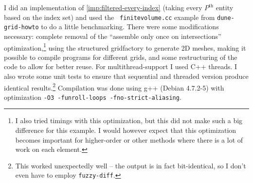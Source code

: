 \documentclass{article}
\newcommand\gridhowto{{\tt dune-grid-howto}\xspace}
\begin{document}
\begin{comment}
| Yasp       | 27.7778 | 19.1363 |       | 30.4038 | 16.9045 |       |
| ref=8      | 28.2098 | 15.3266 |       | 34.0757 | 16.4706 |       |
|            | 28.2842 | 15.4153 |       | 30.4185 | 16.7239 |       |
|            | 27.6977 | 15.5652 |       | 29.8972 | 16.8037 |       |
|------------+---------+---------+-------+---------+---------+-------|
| mean       | 27.9924 | 16.3608 |    86 | 31.1988 | 16.7257 |    93 |
| stddev     |  0.2974 |  1.8529 |       |  1.9332 |  0.1854 |       |
|------------+---------+---------+-------+---------+---------+-------|
| SGrid      | 33.3188 |         |       | 38.4664 |         |       |
| ref=8      | 32.1779 |         |       | 38.8568 |         |       |
|            | 33.7675 |         |       | 38.6083 |         |       |
|            | 34.5424 |         |       | 39.3417 |         |       |
|------------+---------+---------+-------+---------+---------+-------|
| mean       | 33.4517 |         |       | 38.8183 |         |       |
| stddev     |  0.9882 |         |       |  0.3844 |         |       |
#+TBLFM: @7$2=vmean(@-II..@-I);%

\end{comment}

I did an implementation of \ref{imp:filtered-every-index} (taking every
$P^\text{th}$ entity based on the index set) and used the {\tt
  finitevolume.cc} example from \gridhowto to do a little benchmarking.  There
were some modifications necessary: complete removal of the ``assemble only
once on intersections'' optimization,\footnote{I also tried timings with this
  optimization, but this did not make such a big difference for this example.
  I would however expect that this optimization becomes important for
  higher-order or other methods where there is a lot of work on each element.}
using the structured gridfactory to generate 2D meshes, making it possible to
compile programs for different grids, and some restructuring of the code to
allow for better reuse.  For multithread-support I used C++ threads.  I also
wrote some unit tests to ensure that sequential and threaded version produce
identical results.\footnote{This worked unexpectedly well -- the output is in
  fact bit-identical, so I don't even have to employ {\tt fuzzy-diff}.}
Compilation was done using g++ (Debian 4.7.2-5) with optimization {\tt -O3
  -funroll-loops -fno-strict-aliasing}.
\end{document}
